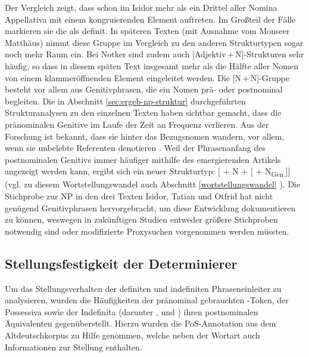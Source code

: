 Der Vergleich zeigt, dass schon im Isidor mehr als ein Drittel aller Nomina Appellativa  mit einem kongruierenden Element auftreten. Im Großteil der Fälle markieren sie die  als definit. In späteren Texten (mit Ausnahme vom Monseer Matthäus) nimmt diese Gruppe im Vergleich zu den anderen Strukturtypen sogar noch mehr Raum ein. Bei Notker sind zudem auch  [Adjektiv\,+\,N]-Strukturen sehr häufig, so dass in diesem späten Text insgesamt mehr als die Hälfte aller Nomen von einem  klammeröffnenden Element eingeleitet werden. Die [N\,+\,N]-Gruppe besteht vor allem aus Genitivphrasen, die ein Nomen prä- oder postnominal begleiten. Die in Abschnitt \ref{sec:ergeb-np-struktur} durchgeführten Strukturanalysen zu den einzelnen Texten haben sichtbar gemacht, dass die pränominalen Genitive   im Laufe der Zeit an Frequenz verlieren. Aus der Forschung ist bekannt, dass sie hinter das Bezugsnomen wandern, vor allem, wenn sie unbelebte Referenten denotieren \parencite{Demske2001}. Weil der Phrasenanfang des postnominalen Genitivs  immer häufiger mithilfe des emergierenden Artikels angezeigt werden kann, ergibt sich ein neuer Strukturtyp: [ + N + [ + N\textsubscript{Gen.}]] (vgl. zu diesem Wortstellungswandel  auch Abschnitt \ref{wortstellungswandel} ). Die Stichprobe zur NP in den drei Texten Isidor, Tatian und Otfrid hat nicht genügend Genitivphrasen hervorgebracht, um diese Entwicklung dokumentieren zu können, weswegen in zukünftigen Studien entweder größere Stichproben notwendig sind oder modifizierte Proxysuchen  vorgenommen werden müssten.   


\subsection{Stellungsfestigkeit der Determinierer} \label{sec:ergebnisse-stellung}

Um das Stellungsverhalten   der definiten und indefiniten Phraseneinleiter zu analysieren, wurden die Häufigkeiten der pränominal  gebrauchten -Token, der Possessiva  sowie der Indefinita  (darunter ,  und ) ihren postnominalen Äquivalenten gegenüberstellt. Hierzu wurden die PoS-Annotation  aus dem Altdeutschkorpus  zu Hilfe genommen, welche neben der Wortart auch Informationen zur Stellung enthalten. 

